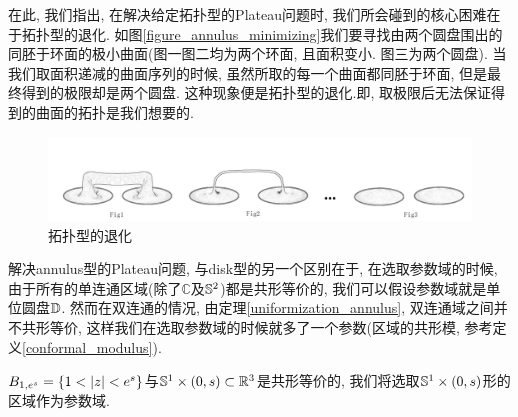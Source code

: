 在此, 我们指出, 在解决给定拓扑型的Plateau问题时, 我们所会碰到的核心困难在于拓扑型的退化. 如图\eqref{figure_annulus_minimizing}我们要寻找由两个圆盘围出的同胚于环面的极小曲面(图一图二均为两个环面, 且面积变小. 图三为两个圆盘). 当我们取面积递减的曲面序列的时候, 虽然所取的每一个曲面都同胚于环面, 但是最终得到的极限却是两个圆盘. 这种现象便是拓扑型的退化.即, 取极限后无法保证得到的曲面的拓扑是我们想要的.
\begin{figure}[ht]
    \centering
    \includegraphics[scale=0.8]{images/annulus_minimizing.png}
    \caption{拓扑型的退化}
    \label{figure_annulus_minimizing}
\end{figure}

\par 解决annulus型的Plateau问题, 与disk型的另一个区别在于, 在选取参数域的时候, 由于所有的单连通区域(除了$\mathbb{C}$及$\S^2$)都是共形等价的, 我们可以假设参数域就是单位圆盘$\D$. 然而在双连通的情况, 由定理\eqref{uniformization_annulus}, 双连通域之间并不共形等价, 这样我们在选取参数域的时候就多了一个参数(区域的共形模, 参考定义\eqref{conformal_modulus}).  
\begin{remark}
    $B_{1,e^s}=\{1<\abs{z}< e^s\}$与$\S^1\times (0, s)\subset \R^3$是共形等价的,  我们将选取$\S^1\times (0,s)$形的区域作为参数域.
\end{remark}

